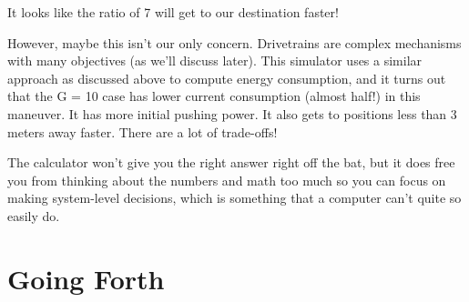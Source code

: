 \documentclass[10pt,letterpaper]{book}
\begin{document}
	It looks like the ratio of 7 will get to our destination faster!
	
	However, maybe this isn't our only concern. Drivetrains are complex mechanisms with many objectives (as we'll discuss later). This simulator uses a similar approach as discussed above to compute energy consumption, and it turns out that the G = 10 case has lower current consumption (almost half!) in this maneuver. It has more initial pushing power. It also gets to positions less than 3 meters away faster. There are a lot of trade-offs!
	
	The calculator won't give you the right answer right off the bat, but it does free you from thinking about the numbers and math too much so you can focus on making system-level decisions, which is something that a computer can't quite so easily do.
	
\chapter{Going Forth}


\printindex
\end{document}
